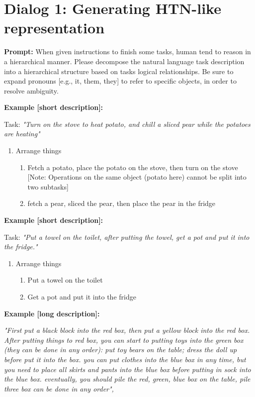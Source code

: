 \documentclass{article}
\begin{document}
\section*{Dialog 1: Generating HTN-like representation}
\textbf{Prompt:}
When given instructions to finish some tasks, human tend to reason in a hierarchical manner. Please decompose the natural language task description into a hierarchical structure based on tasks logical relationships.  Be sure to expand pronouns [e.g., it, them, they] to refer to specific objects, in order to resolve ambiguity. 

\textbf{Example [short description]:}

Task: \textit{"Turn on the stove to heat potato, and chill a sliced pear while the potatoes are heating"}
\begin{enumerate}
    \item  Arrange things
    \begin{enumerate}
        \item Fetch a potato, place the potato on the stove, then turn on the stove [Note: Operations on the same object (potato here) cannot be split into two subtasks]
        \item fetch a pear, sliced the pear, then place the pear in the fridge
    \end{enumerate}
\end{enumerate}

\textbf{Example [short description]:}

Task:\textit{ "Put a towel on the toilet, after putting the towel, get a pot and put it into the fridge."}
\begin{enumerate}
    \item  Arrange things
    \begin{enumerate}
        \item Put a towel on the toilet
        \item Get a pot and put it into the fridge
    \end{enumerate}
\end{enumerate}
    
\textbf{Example [long description]:}

\textit{"First put a black block into the red box, then put a yellow block into the red box. After putting things to red box, you can start to putting toys into the green box (they can be done in any order): put toy bears on the table; dress the doll up before put it into the box. you can put clothes into the blue box in any time, but you need to place all skirts and pants into the blue box before putting in sock into the blue box. eventually, you should pile the red, green, blue box on the table, pile three box can be done in any order",}
\end{document}
